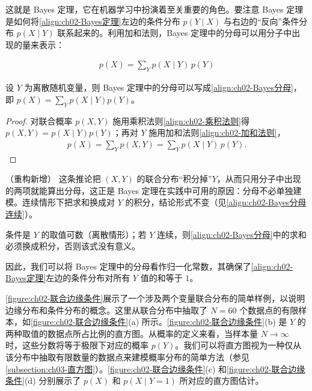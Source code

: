 \documentclass[../../main.tex]{subfiles}
\begin{document}
这就是 Bayes 定理，它在机器学习中扮演着至关重要的角色。要注意 Bayes 定理是如何将\eqref{align:ch02-Bayes定理}左边的条件分布 $p(Y\mid X)$ 与右边的“反向”条件分布 $p(X\mid Y)$ 联系起来的。利用加和法则，Bayes 定理中的分母可以用分子中出现的量来表示：

\begin{align}
  p(X) = \sum_{Y} p(X\mid Y)\,p(Y)
  \label{align:ch02-Bayes分母}
\end{align}

\begin{proposition}\label{proposition:ch02-Bayes分母}
设 $Y$ 为离散随机变量，则 Bayes 定理中的分母可以写成\eqref{align:ch02-Bayes分母}，即 $p(X)=\sum_{Y}p(X\mid Y)p(Y)$。
\end{proposition}

\begin{proof}
对联合概率 $p(X,Y)$ 施用乘积法则\eqref{align:ch02-乘积法则}得 $p(X,Y)=p(X\mid Y)p(Y)$；再对 $Y$ 施用加和法则\eqref{align:ch02-加和法则}，
\begin{align*}
  p(X) = \sum_{Y} p(X,Y) = \sum_{Y} p(X\mid Y)\,p(Y) .
\end{align*}
\end{proof}

\begin{remark}（重构新增）
这条推论把 $(X,Y)$ 的联合分布“积分掉”$Y$，从而只用分子中出现的两项就能算出分母，这正是 Bayes 定理在实践中可用的原因：分母不必单独建模。连续情形下把求和换成对 $Y$ 的积分，结论形式不变（见\eqref{align:ch02-Bayes分母连续}）。

条件是 $Y$ 的取值可数（离散情形）；若 $Y$ 连续，则\eqref{align:ch02-Bayes分母}中的求和必须换成积分，否则该式没有意义。
\end{remark}

因此，我们可以将 Bayes 定理中的分母看作归一化常数，其确保了\eqref{align:ch02-Bayes定理}左边的条件分布对所有 $Y$ 值的和等于 $1$。

\cref{figure:ch02-联合边缘条件}展示了一个涉及两个变量联合分布的简单样例，以说明边缘分布和条件分布的概念。这里从联合分布中抽取了 $N=60$ 个数据点的有限样本，如\cref{figure:ch02-联合边缘条件}(a) 所示。\cref{figure:ch02-联合边缘条件}(b) 是 $Y$ 的两种取值的数据点所占比例的直方图。从概率的定义来看，当样本量 $N\to\infty$ 时，这些分数将等于极限下对应的概率 $p(Y)$。我们可以将直方图视为一种仅从该分布中抽取有限数量的数据点来建模概率分布的简单方法（参见\cref{subsection:ch03-直方图}）。\cref{figure:ch02-联合边缘条件}(c) 和\cref{figure:ch02-联合边缘条件}(d) 分别展示了 $p(X)$ 和 $p(X\mid Y=1)$ 所对应的直方图估计。
\end{document}
